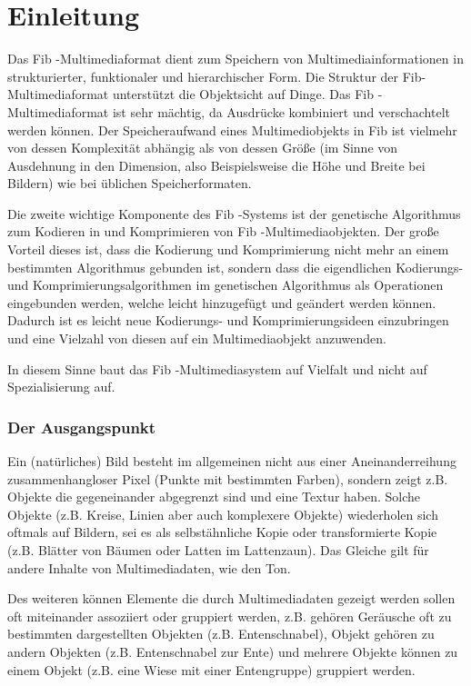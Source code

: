 \documentclass[11pt,a4paper]{article}
\begin{document}
\part{Einleitung}

Das Fib -Multimediaformat dient zum Speichern von Multimediainformationen in strukturierter, funktionaler und hierarchischer Form. Die Struktur der Fib- Multimediaformat unterstützt die Objektsicht auf Dinge. Das Fib -Multimediaformat ist sehr mächtig, da Ausdrücke kombiniert und verschachtelt werden können. Der Speicheraufwand eines Multimediobjekts in Fib ist vielmehr von dessen Komplexität abhängig als von dessen Größe (im Sinne von Ausdehnung in den Dimension, also Beispielsweise die Höhe und Breite bei Bildern) wie bei üblichen Speicherformaten.

Die zweite wichtige Komponente des Fib -Systems ist der genetische Algorithmus zum Kodieren in und Komprimieren von Fib -Multimediaobjekten. Der große Vorteil dieses ist, dass die Kodierung und Komprimierung nicht mehr an einem bestimmten Algorithmus gebunden ist, sondern dass die eigendlichen Kodierungs- und Komprimierungsalgorithmen im genetischen Algorithmus als Operationen eingebunden werden, welche leicht hinzugefügt und geändert werden können. Dadurch ist es leicht neue Kodierungs- und Komprimierungsideen einzubringen und eine Vielzahl von diesen auf ein Multimediaobjekt anzuwenden.

In diesem Sinne baut das Fib -Multimediasystem auf Vielfalt und nicht auf Spezialisierung auf.


\section{Der Ausgangspunkt}

Ein (natürliches) Bild besteht im allgemeinen nicht aus einer Aneinanderreihung zusammenhangloser Pixel (Punkte mit bestimmten Farben), sondern zeigt z.B. Objekte die gegeneinander abgegrenzt sind und eine Textur haben. Solche Objekte (z.B. Kreise, Linien aber auch komplexere Objekte) wiederholen sich oftmals auf Bildern, sei es als selbstähnliche Kopie oder transformierte Kopie (z.B. Blätter von Bäumen oder Latten im Lattenzaun). Das Gleiche gilt für andere Inhalte von Multimediadaten, wie den Ton.

Des weiteren können Elemente die durch Multimediadaten gezeigt werden sollen oft miteinander assoziiert oder gruppiert werden, z.B. gehören Geräusche oft zu bestimmten dargestellten Objekten (z.B. Entenschnabel), Objekt gehören zu andern Objekten (z.B. Entenschnabel zur Ente) und mehrere Objekte  können zu einem Objekt (z.B. eine Wiese mit einer Entengruppe) gruppiert werden.
\end{document}
